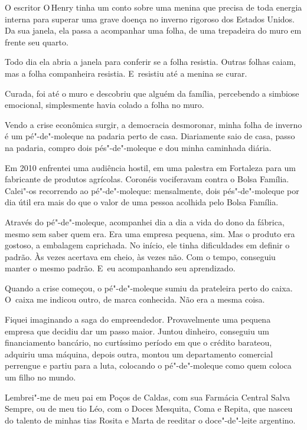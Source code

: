  

O escritor O\,Henry tinha um conto sobre uma menina que precisa de toda
energia interna para superar uma grave doença no inverno rigoroso dos
Estados Unidos. Da sua janela, ela passa a acompanhar uma folha, de uma
trepadeira do muro em frente seu quarto.

 Todo dia ela abria a janela para conferir se a folha resistia. Outras
folhas caiam, mas a folha companheira resistia. E~resistiu até a menina
se curar.

Curada, foi até o muro e descobriu que alguém da família, percebendo a
simbiose emocional, simplesmente havia colado a folha no muro.

Vendo a crise econômica surgir, a democracia desmoronar, minha folha de
inverno é um pé"-de"-moleque na padaria perto de casa. Diariamente saio de
casa, passo na padaria, compro dois pés"-de"-moleque e dou minha caminhada
diária.

Em 2010 enfrentei uma audiência hostil, em uma palestra em Fortaleza
para um fabricante de produtos agrícolas. Coronéis vociferavam contra o
Bolsa Família. Calei"-os recorrendo ao pé"-de"-moleque: mensalmente, dois
pés"-de"-moleque por dia útil era mais do que o valor de uma pessoa
acolhida pelo Bolsa Família.

Através do pé"-de"-moleque, acompanhei dia a dia a vida do dono da
fábrica, mesmo sem saber quem era. Era uma empresa pequena, sim. Mas o
produto era gostoso, a embalagem caprichada. No início, ele tinha
dificuldades em definir o padrão. Às vezes acertava em cheio, às vezes
não. Com o tempo, conseguiu manter o mesmo padrão. E~eu acompanhando seu
aprendizado.

Quando a crise começou, o pé"-de"-moleque sumiu da prateleira perto do
caixa. O~caixa me indicou outro, de marca conhecida. Não era a mesma
coisa.

Fiquei imaginando a saga do empreendedor. Provavelmente uma pequena
empresa que decidiu dar um passo maior. Juntou dinheiro, conseguiu um
financiamento bancário, no curtíssimo período em que o crédito barateou,
adquiriu uma máquina, depois outra, montou um departamento comercial
perrengue e partiu para a luta, colocando o pé"-de"-moleque como quem
coloca um filho no mundo.

Lembrei"-me de meu pai em Poços de Caldas, com sua Farmácia Central Salva
Sempre, ou de meu tio Léo, com o Doces Mesquita, Coma e Repita, que
nasceu do talento de minhas tias Rosita e Marta de reeditar o
doce"-de"-leite argentino.

